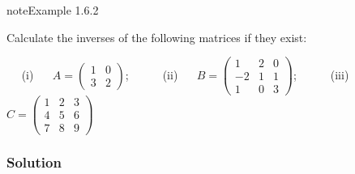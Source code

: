 \documentclass[letterpaper,10pt,english]{jupyterBook}
\begin{document}
\label{_pages/1.5_Inverse_matrix:matrix-inverse-example-2}
\begin{sphinxadmonition}{note}{Example 1.6.2}



\sphinxAtStartPar
Calculate the inverses of the following matrices if they exist:

\sphinxAtStartPar
  (i)   \(A = \begin{pmatrix}1 & 0 \\ 3 & 2\end{pmatrix}\);  
  (ii)   \(B = \begin{pmatrix} 1 & 2 & 0 \\ -2 & 1 & 1 \\ 1 & 0 & 3 \end{pmatrix}\);  
  (iii)   \(C = \begin{pmatrix}1 & 2 & 3 \\ 4 & 5 & 6 \\ 7 & 8 & 9 \end{pmatrix}\)
\subsubsection*{Solution}


\end{sphinxadmonition}
\end{document}
